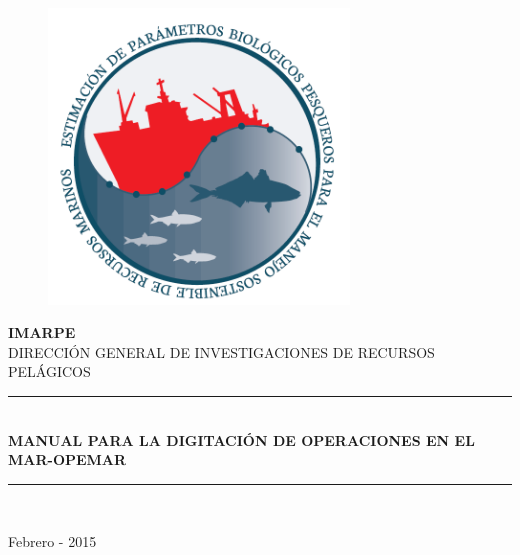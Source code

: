 \documentclass[a4paper,oneside,11pt]{book}
\begin{document}
\begin{titlepage}


\begin{figure}
\centering
\includegraphics[width=8cm]{imagen_manual_OPEMAR/logo.png}
\end{figure}




\begin{center}
\Large \textbf{IMARPE}\\
\vspace*{0.1in}
\large {DIRECCIÓN GENERAL DE INVESTIGACIONES DE RECURSOS PELÁGICOS} \\ 

\end{center}

\vspace*{0.6in}
\begin{large}
\end{large}
\vspace*{0.2in}
\begin{Large}
\begin{center}
\rule{150mm}{0.3mm}\\
\huge {\textbf{MANUAL PARA LA DIGITACIÓN DE OPERACIONES EN EL MAR-OPEMAR}} \\
\rule{150mm}{0.3mm}\\
\end{center}
\end{Large}
\vspace*{0.1in}
\begin{large}
\end{large}
\begin{center}
\vspace*{0.1in}
\vspace*{0.1in}
\begin{large}
\Large {Febrero - 2015}
\end{large}
\end{center}
\end{titlepage}
\end{document}
